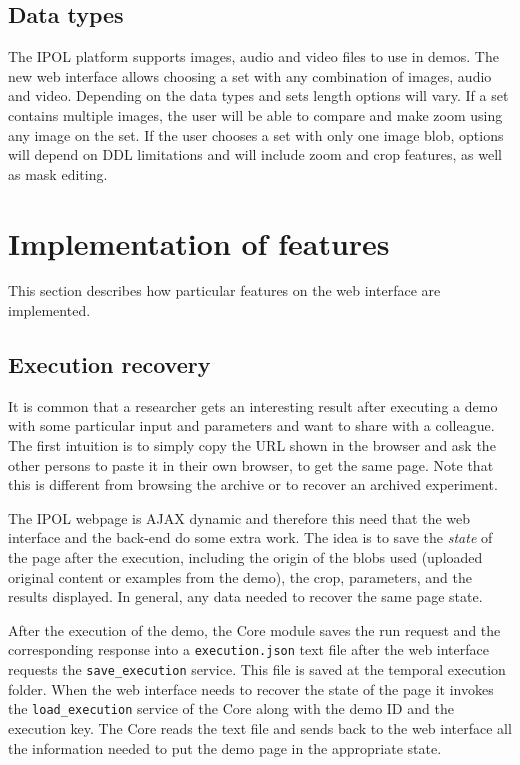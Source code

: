
\subsection{Data types}
The IPOL platform supports images, audio and video files to use in demos. The new web interface 
allows choosing a set with any combination of images, audio and video. Depending on the data types and sets length options will vary. 
If a set contains multiple images, the user will be able to compare and make zoom using any image on the set. If the user chooses a set with only 
one image blob, options will depend on DDL limitations and will include zoom and crop features, as well as mask editing.

\section{Implementation of features}
This section describes how particular features on the web interface are implemented.

%
\subsection{Execution recovery}
It is common that a researcher gets an interesting result after executing a demo with some particular input and parameters and want to share with a colleague. The first intuition is to simply copy the URL shown in the browser and ask the other persons to paste it in their own browser, to get the same page. Note that this is different from browsing the archive or to recover an archived experiment.

The IPOL webpage is AJAX dynamic and therefore this need that the web interface and the back-end do some extra work. The idea is to save the \emph{state} of the page after the execution, including the origin of the blobs used (uploaded original content or examples from the demo), the crop, parameters, and the results displayed. In general, any data needed to recover the same page state.

After the execution of the demo, the Core module saves the run request and the corresponding response into a {\tt execution.json} text file after the web interface requests the {\tt save\_execution} service. This file is saved at the temporal execution folder.
%
When the web interface needs to recover the state of the page it invokes the {\tt load\_execution} service of the Core along with the demo ID and the execution key. The Core reads the text file and sends back to the web interface all the information needed to put the demo page in the appropriate state.


